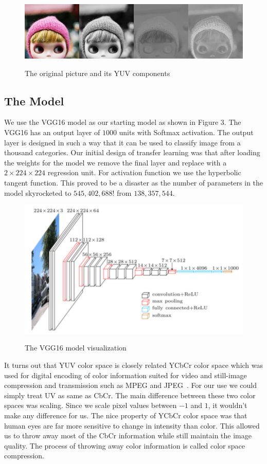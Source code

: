 \documentclass[12pt]{article}
\begin{document}
\begin{figure}[!ht]
 \centering
  \includegraphics[width=5.0in]{resource/YUV.png}
 \label{yuvimage}
 \caption{The original picture and its YUV components}
\end{figure}


\subsection{The Model}
We use the VGG16 model as our starting model as shown in Figure 3. The VGG16 has an output layer of $1000$ units with Softmax activation. The output layer is designed in such a way that it can be used to classify image from a thousand categories. Our initial design of transfer learning was that after loading the weights for the model we remove the final layer and replace with a $2\times224\times224$ regression unit. For activation function we use the hyperbolic tangent function. This proved to be a disaster as the number of parameters in the model skyrocketed to $545,402,688$! from  $138,357,544$. 


\begin{figure}[H]
 \centering
  \includegraphics[width=5.0in]{resource/vgg16.png}
\center
\label{fig:vggvis}
 \caption{The VGG16 model visualization}
\end{figure}

It turns out that YUV color space is closely related YCbCr color space which was used for digital encoding of color information suited for video and still-image compression and transmission such as MPEG and JPEG~\cite{YUVWIKI}. For our use we could simply treat UV as same as CbCr. The main difference between these two color spaces was scaling. Since we scale pixel values between $-1$ and $1$, it wouldn't make any difference for us. The nice property of YCbCr color space was that human eyes are far more sensitive to change in intensity than color. This allowed us to throw away most of the CbCr information while still maintain the image quality. The process of throwing away color information is called color space compression. 
\end{document}
